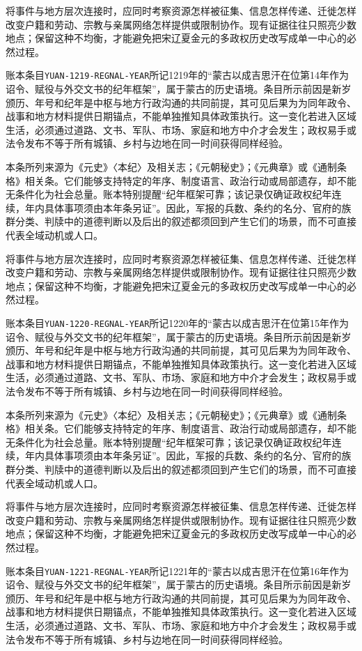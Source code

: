 将事件与地方层次连接时，应同时考察资源怎样被征集、信息怎样传递、迁徙怎样改变户籍和劳动、宗教与亲属网络怎样提供或限制协作。现有证据往往只照亮少数地点；保留这种不均衡，才能避免把宋辽夏金元的多政权历史改写成单一中心的必然过程。

账本条目\texttt{YUAN-1219-REGNAL-YEAR}所记1219年的“蒙古以成吉思汗在位第14年作为诏令、赋役与外交文书的纪年框架”，属于蒙古的历史语境。条目所示前因是新岁颁历、年号和纪年是中枢与地方行政沟通的共同前提，其可见后果为为同年政令、战事和地方材料提供日期锚点，不能单独推知具体政策执行。这一变化若进入区域生活，必须通过道路、文书、军队、市场、家庭和地方中介才会发生；政权易手或法令发布不等于所有城镇、乡村与边地在同一时间获得同样经验。

本条所列来源为《元史》〈本纪〉及相关志；《元朝秘史》；《元典章》或《通制条格》相关条。它们能够支持特定的年序、制度语言、政治行动或局部遗存，却不能无条件化为社会总量。账本特别提醒“纪年框架可靠；该记录仅确证政权纪年连续，年内具体事项须由本年条另证”。因此，军报的兵数、条约的名分、官府的族群分类、判牍中的道德判断以及后出的叙述都须回到产生它们的场景，而不可直接代表全域动机或人口。

将事件与地方层次连接时，应同时考察资源怎样被征集、信息怎样传递、迁徙怎样改变户籍和劳动、宗教与亲属网络怎样提供或限制协作。现有证据往往只照亮少数地点；保留这种不均衡，才能避免把宋辽夏金元的多政权历史改写成单一中心的必然过程。

账本条目\texttt{YUAN-1220-REGNAL-YEAR}所记1220年的“蒙古以成吉思汗在位第15年作为诏令、赋役与外交文书的纪年框架”，属于蒙古的历史语境。条目所示前因是新岁颁历、年号和纪年是中枢与地方行政沟通的共同前提，其可见后果为为同年政令、战事和地方材料提供日期锚点，不能单独推知具体政策执行。这一变化若进入区域生活，必须通过道路、文书、军队、市场、家庭和地方中介才会发生；政权易手或法令发布不等于所有城镇、乡村与边地在同一时间获得同样经验。

本条所列来源为《元史》〈本纪〉及相关志；《元朝秘史》；《元典章》或《通制条格》相关条。它们能够支持特定的年序、制度语言、政治行动或局部遗存，却不能无条件化为社会总量。账本特别提醒“纪年框架可靠；该记录仅确证政权纪年连续，年内具体事项须由本年条另证”。因此，军报的兵数、条约的名分、官府的族群分类、判牍中的道德判断以及后出的叙述都须回到产生它们的场景，而不可直接代表全域动机或人口。

将事件与地方层次连接时，应同时考察资源怎样被征集、信息怎样传递、迁徙怎样改变户籍和劳动、宗教与亲属网络怎样提供或限制协作。现有证据往往只照亮少数地点；保留这种不均衡，才能避免把宋辽夏金元的多政权历史改写成单一中心的必然过程。

账本条目\texttt{YUAN-1221-REGNAL-YEAR}所记1221年的“蒙古以成吉思汗在位第16年作为诏令、赋役与外交文书的纪年框架”，属于蒙古的历史语境。条目所示前因是新岁颁历、年号和纪年是中枢与地方行政沟通的共同前提，其可见后果为为同年政令、战事和地方材料提供日期锚点，不能单独推知具体政策执行。这一变化若进入区域生活，必须通过道路、文书、军队、市场、家庭和地方中介才会发生；政权易手或法令发布不等于所有城镇、乡村与边地在同一时间获得同样经验。

